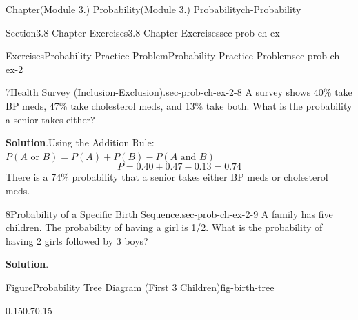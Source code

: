 \documentclass[oneside,10pt,]{book}
\newcommand{\blocktitlefont}{\relax}
\begin{document}
\begin{chapterptx}{Chapter}{(Module 3.) Probability}{}{(Module 3.) Probability}{}{}{ch-Probability}
\begin{sectionptx}{Section}{3.8 Chapter Exercises}{}{3.8 Chapter Exercises}{}{}{sec-prob-ch-ex}
\begin{exercises-subsection-numberless}{Exercises}{Probability Practice Problem}{}{Probability Practice Problem}{}{}{sec-prob-ch-ex-2}
\begin{divisionexercise}{7}{Health Survey (Inclusion-Exclusion).}{}{sec-prob-ch-ex-2-8}
A survey shows 40\% take BP meds, 47\% take cholesterol meds, and 13\% take both. What is the probability a senior takes either?%
\par\smallskip%
\noindent\textbf{\blocktitlefont Solution}.\hypertarget{sec-prob-ch-ex-2-8-3}{}\quad{}Using the Addition Rule: \(P(A \text{ or } B) = P(A) + P(B) - P(A \text{ and } B)\)%
\begin{equation*}
P = 0.40 + 0.47 - 0.13 = 0.74
\end{equation*}
There is a 74\% probability that a senior takes either BP meds or cholesterol meds.%
\end{divisionexercise}%
\begin{divisionexercise}{8}{Probability of a Specific Birth Sequence.}{}{sec-prob-ch-ex-2-9}%
A family has five children. The probability of having a girl is 1\slash{}2. What is the probability of having 2 girls followed by 3 boys?%
\par\smallskip%
\noindent\textbf{\blocktitlefont Solution}.\hypertarget{sec-prob-ch-ex-2-9-3}{}\quad{}\begin{figureptx}{Figure}{Probability Tree Diagram (First 3 Children)}{fig-birth-tree}{}%
\begin{image}{0.15}{0.7}{0.15}{}%
%
\end{image}%

\end{figureptx}
\end{divisionexercise}
\end{exercises-subsection-numberless}
\end{sectionptx}
\end{chapterptx}
\end{document}
